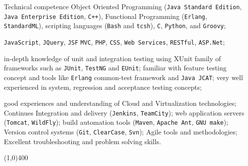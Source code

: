 \documentclass{resume}
\begin{document}
\begin{category}{Technical competence}
\hspace{1 mm}Object Oriented Programming 
(\texttt{Java Standard Edition}, \texttt{Java Enterprise Edition}, \texttt{C++}), 
Functional Programming (\texttt{Erlang}, \texttt{StandardML}), 
scripting languages (\texttt{Bash} and \texttt{tcsh}), \texttt{C}, \texttt{Python}, 
and \texttt{Groovy};

\hspace{1 mm}\texttt{JavaScript}, \texttt{JQuery}, \texttt{JSF} 
\texttt{MVC}, \texttt{PHP}, \texttt{CSS}, \texttt{Web Services}, \texttt{RESTful}, \texttt{ASP.Net};


\hspace{1 mm}in-depth knowledge of unit and integration 
testing using XUnit family of frameworks such as \texttt{JUnit}, \texttt{TestNG} and \texttt{EUnit}; 
familiar with feature testing concept and tools like \texttt{Erlang} common-test 
framework and \texttt{Java JCAT}; very well experienced in system, regression and acceptance testing concepts;

\hspace{1 mm}good experiences and understanding of Cloud and Virtualization technologies;
Continues Integration and delivery (\texttt{Jenkins}, \texttt{TeamCity});
web application servers (\texttt{Tomcat}, \texttt{WildFly}); 
build automation tools (\texttt{Maven}, \texttt{Apache Ant}, \texttt{GNU make}); 
Version control systems (\texttt{Git}, \texttt{ClearCase}, \texttt{Svn});
Agile tools and methodologies; Excellent troubleshooting and problem solving skills.

\end{category}

\begin{center}
\line(1,0){400}
\end{center}
\end{document}
